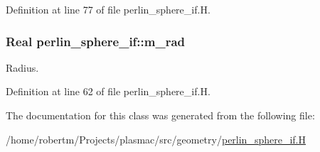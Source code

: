 Definition at line 77 of file perlin\+\_\+sphere\+\_\+if.\+H.

\subsubsection[{\texorpdfstring{m\+\_\+rad}{m_rad}}]{\setlength{\rightskip}{0pt plus 5cm}Real perlin\+\_\+sphere\+\_\+if\+::m\+\_\+rad\hspace{0.3cm}{\ttfamily [protected]}}\hypertarget{classperlin__sphere__if_a85022e4151bf46031f3e04b25b6ad8b1}{}\label{classperlin__sphere__if_a85022e4151bf46031f3e04b25b6ad8b1}


Radius. 



Definition at line 62 of file perlin\+\_\+sphere\+\_\+if.\+H.



The documentation for this class was generated from the following file\+:\begin{DoxyCompactItemize}
\item 
/home/robertm/\+Projects/plasmac/src/geometry/\hyperlink{perlin__sphere__if_8H}{perlin\+\_\+sphere\+\_\+if.\+H}\end{DoxyCompactItemize}
